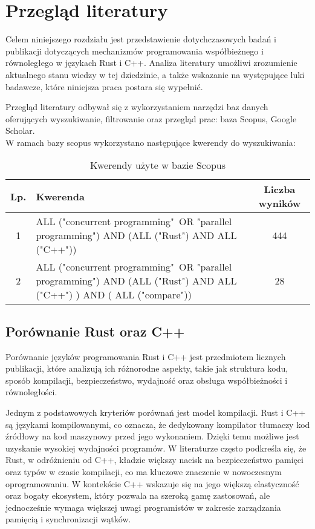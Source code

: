 \chapter{Przegląd literatury}
Celem niniejszego rozdziału jest przedstawienie dotychczasowych badań i publikacji dotyczących mechanizmów programowania współbieżnego i równoległego w językach Rust i C++. Analiza literatury umożliwi zrozumienie aktualnego stanu wiedzy w tej dziedzinie, a także wskazanie na występujące luki badawcze, które niniejsza praca postara się wypełnić.

Przegląd literatury odbywał się z wykorzystaniem narzędzi baz danych oferujących wyszukiwanie, filtrowanie oraz przegląd prac: baza Scopus, Google Scholar.\\
W ramach bazy scopus wykorzystano następujące kwerendy do wyszukiwania:

\begin{table}[H]
    \caption{Kwerendy użyte w bazie Scopus \protect \footnotemark}
    \label{table:literatureReviewQueries}
    \begin{tabular}{|c|p{11cm}|c|}
    \hline
    Lp. & Kwerenda & Liczba wyników \\ \hline
    1 & ALL ("concurrent programming"\ OR "parallel programming") AND (ALL ("Rust") AND ALL ("C++")) & 444 \\ \hline
    2 & ALL ("concurrent programming"\ OR "parallel programming") AND (ALL ("Rust") AND ALL ("C++") ) AND ( ALL ("compare")) & 28 \\ \hline
    \end{tabular}
\end{table}


\section{Porównanie Rust oraz C++}
Porównanie języków programowania Rust i C++ jest przedmiotem licznych publikacji, które analizują ich różnorodne aspekty, takie jak struktura kodu, sposób kompilacji, bezpieczeństwo, wydajność oraz obsługa współbieżności i równoległości.

Jednym z podstawowych kryteriów porównań jest model kompilacji. Rust i C++ są językami kompilowanymi, co oznacza, że dedykowany kompilator tłumaczy kod źródłowy na kod maszynowy przed jego wykonaniem. Dzięki temu możliwe jest uzyskanie wysokiej wydajności programów. W literaturze często podkreśla się, że Rust, w odróżnieniu od C++, kładzie większy nacisk na bezpieczeństwo pamięci oraz typów w czasie kompilacji, co ma kluczowe znaczenie w nowoczesnym oprogramowaniu. W kontekście C++ wskazuje się na jego większą elastyczność oraz bogaty ekosystem, który pozwala na szeroką gamę zastosowań, ale jednocześnie wymaga większej uwagi programistów w zakresie zarządzania pamięcią i synchronizacji wątków.

